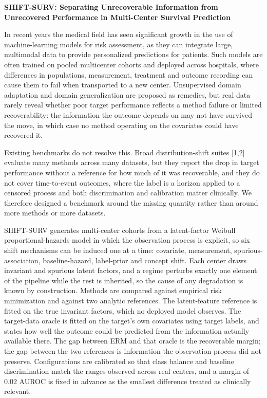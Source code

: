 \documentclass[10pt]{article}
\begin{document}
\begin{center}
{\large\bf SHIFT-SURV: Separating Unrecoverable Information from\\
Unrecovered Performance in Multi-Center Survival Prediction}
\end{center}

\vspace{2pt}

In recent years the medical field has seen significant growth in the use of
machine-learning models for risk assessment, as they can integrate large,
multimodal data to provide personalized predictions for patients. Such models
are often trained on pooled multicenter cohorts and deployed across hospitals,
where differences in populations, measurement, treatment and outcome recording
can cause them to fail when transported to a new center. Unsupervised domain
adaptation and domain generalization are proposed as remedies, but real data
rarely reveal whether poor target performance reflects a method failure or
limited recoverability: the information the outcome depends on may not have
survived the move, in which case no method operating on the covariates could
have recovered it.

Existing benchmarks do not resolve this. Broad distribution-shift suites [1,2]
evaluate many methods across many datasets, but they report the drop in target
performance without a reference for how much of it was recoverable, and they do
not cover time-to-event outcomes, where the label is a horizon applied to a
censored process and both discrimination and calibration matter clinically. We
therefore designed a benchmark around the missing quantity rather than around
more methods or more datasets.

SHIFT-SURV generates multi-center cohorts from a latent-factor Weibull
proportional-hazards model in which the observation process is explicit, so six
shift mechanisms can be induced one at a time: covariate, measurement,
spurious-association, baseline-hazard, label-prior and concept shift. Each
center draws invariant and spurious latent factors, and a regime perturbs
exactly one element of the pipeline while the rest is inherited, so the cause of
any degradation is known by construction. Methods are compared against
empirical risk minimization and against two analytic references. The
latent-feature reference is fitted on the true invariant factors, which no
deployed model observes. The target-data oracle is fitted on the target's own
covariates using target labels, and states how well the outcome could be
predicted from the information actually available there. The gap between ERM and
that oracle is the recoverable margin; the gap between the two references is
information the observation process did not preserve. Configurations are
calibrated so that class balance and baseline discrimination match the ranges
observed across real centers, and a margin of $0.02$ AUROC is fixed in advance
as the smallest difference treated as clinically relevant.
\end{document}
